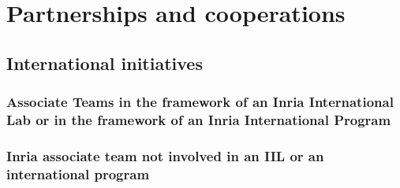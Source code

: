 \section{Partnerships and cooperations}
\label{diverse:partnerships}
\subsection{International initiatives}

\subsubsection{Associate Teams in the framework of an Inria International Lab or in the framework of an Inria International Program}

\subsubsection{Inria associate team not involved in an IIL or an international program}


